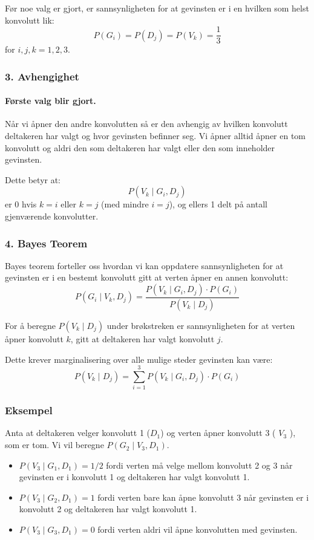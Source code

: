 \documentclass[
  12pt,
  a4paper,
  DIV=11,
  numbers=noendperiod]{scrartcl}
\let\oldparagraph\paragraph
\renewcommand{\paragraph}[1]{\oldparagraph{#1}\mbox{}}
\providecommand{\tightlist}{%
  \setlength{\itemsep}{0pt}\setlength{\parskip}{0pt}}\usepackage{longtable,booktabs,array}
\begin{document}
Før noe valg er gjort, er sannsynligheten for at gevinsten er i en
hvilken som helst konvolutt lik:
\[ P(G_i) = P(D_j) = P(V_k) = \frac{1}{3} \] for \(i, j, k = 1, 2, 3\).

\subsubsection{3. Avhengighet}\label{avhengighet}

\paragraph{Første valg blir gjort.}\label{fuxf8rste-valg-blir-gjort.}

Når vi åpner den andre konvolutten så er den avhengig av hvilken
konvolutt deltakeren har valgt og hvor gevinsten befinner seg. Vi åpner
alltid åpner en tom konvolutt og aldri den som deltakeren har valgt
eller den som inneholder gevinsten.

Dette betyr at: \[ P(V_k \mid G_i, D_j) \] er 0 hvis \(k = i\) eller
\(k = j\) (med mindre \(i = j\)), og ellers 1 delt på antall gjenværende
konvolutter.

\subsubsection{4. Bayes Teorem}\label{bayes-teorem}

Bayes teorem forteller oss hvordan vi kan oppdatere sannsynligheten for
at gevinsten er i en bestemt konvolutt gitt at verten åpner en annen
konvolutt: \[ 
P(G_i \mid V_k, D_j) = \frac{P(V_k \mid G_i, D_j) \cdot P(G_i)}{P(V_k \mid D_j)} 
\]

For å beregne \(P(V_k \mid D_j)\) under brøkstreken er sannsynligheten
for at verten åpner konvolutt \(k\), gitt at deltakeren har valgt
konvolutt \(j\).

Dette krever marginalisering over alle mulige steder gevinsten kan være:
\[ P(V_k \mid D_j) = \sum_{i=1}^3 P(V_k \mid G_i, D_j) \cdot P(G_i) \]

\subsubsection{Eksempel}\label{eksempel}

Anta at deltakeren velger konvolutt 1 (\(D_1\)) og verten åpner
konvolutt 3 ( \(V_3\) ), som er tom. Vi vil beregne
\(P(G_2 \mid V_3, D_1)\).

\begin{itemize}
\tightlist
\item
  \(P(V_3 \mid G_1, D_1) = 1/2\) fordi verten må velge mellom konvolutt
  2 og 3 når gevinsten er i konvolutt 1 og deltakeren har valgt
  konvolutt 1.
\item
  \(P(V_3 \mid G_2, D_1) = 1\) fordi verten bare kan åpne konvolutt 3
  når gevinsten er i konvolutt 2 og deltakeren har valgt konvolutt 1.
\item
  \(P(V_3 \mid G_3, D_1) = 0\) fordi verten aldri vil åpne konvolutten
  med gevinsten.
\end{itemize}
\end{document}
